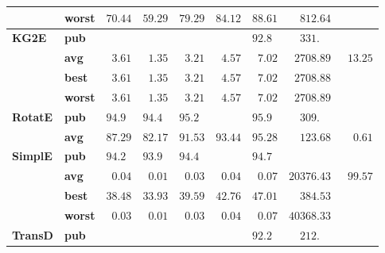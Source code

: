 \begin{tabular}{llrrrrrrr}
       & \textbf{worst} &            $70.44$ &            $59.29$ &            $79.29$ &            $84.12$ &            $88.61$ &            $\phantom{00}812.64$ &                     \\\midrule
\textbf{KG2E} & \textbf{pub} &                    &                    &                    &                    &  $92.8\phantom{0}$ &  $\phantom{00}331.\phantom{00}$ &                     \\
       & \textbf{avg} &  $\phantom{0}3.61$ &  $\phantom{0}1.35$ &  $\phantom{0}3.21$ &  $\phantom{0}4.57$ &  $\phantom{0}7.02$ &            $\phantom{0}2708.89$ &  $\phantom{0}13.25$ \\
       & \textbf{best} &  $\phantom{0}3.61$ &  $\phantom{0}1.35$ &  $\phantom{0}3.21$ &  $\phantom{0}4.57$ &  $\phantom{0}7.02$ &            $\phantom{0}2708.88$ &                     \\
       & \textbf{worst} &  $\phantom{0}3.61$ &  $\phantom{0}1.35$ &  $\phantom{0}3.21$ &  $\phantom{0}4.57$ &  $\phantom{0}7.02$ &            $\phantom{0}2708.89$ &                     \\\midrule
\textbf{RotatE} & \textbf{pub} &  $94.9\phantom{0}$ &  $94.4\phantom{0}$ &  $95.2\phantom{0}$ &                    &  $95.9\phantom{0}$ &  $\phantom{00}309.\phantom{00}$ &                     \\
       & \textbf{avg} &            $87.29$ &            $82.17$ &            $91.53$ &            $93.44$ &            $95.28$ &            $\phantom{00}123.68$ &  $\phantom{00}0.61$ \\\midrule
\textbf{SimplE} & \textbf{pub} &  $94.2\phantom{0}$ &  $93.9\phantom{0}$ &  $94.4\phantom{0}$ &                    &  $94.7\phantom{0}$ &                                 &                     \\
       & \textbf{avg} &  $\phantom{0}0.04$ &  $\phantom{0}0.01$ &  $\phantom{0}0.03$ &  $\phantom{0}0.04$ &  $\phantom{0}0.07$ &                      $20376.43$ &  $\phantom{0}99.57$ \\
       & \textbf{best} &            $38.48$ &            $33.93$ &            $39.59$ &            $42.76$ &            $47.01$ &            $\phantom{00}384.53$ &                     \\
       & \textbf{worst} &  $\phantom{0}0.03$ &  $\phantom{0}0.01$ &  $\phantom{0}0.03$ &  $\phantom{0}0.04$ &  $\phantom{0}0.07$ &                      $40368.33$ &                     \\\midrule
\textbf{TransD} & \textbf{pub} &                    &                    &                    &                    &  $92.2\phantom{0}$ &  $\phantom{00}212.\phantom{00}$ &                     \\

\end{tabular}
